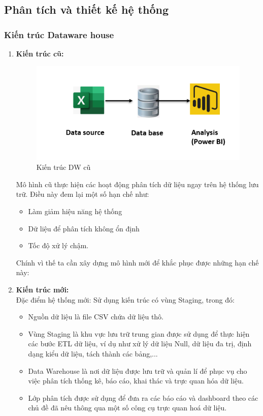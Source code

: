 \subsection{Phân tích và thiết kế hệ thống}

\subsubsection{Kiến trúc Dataware house}
\begin{enumerate}
    \item \textbf{Kiến trúc cũ:}
    \begin{center}
            \begin{figure}[!h]
                \centering
                \includegraphics[scale = 1]{figures/Duyen/Kiến trúc cũ.PNG}
              \caption{Kiến trúc DW cũ}
            \end{figure}
\end{center}
    Mô hình cũ thực hiện các hoạt động phân tích dữ liệu ngay trên hệ thống lưu trữ. Điều này đem lại một số hạn chế như:
    \begin{itemize}[label=$-$]
        \item Làm giảm hiệu năng hệ thống 
\item Dữ liệu để phân tích không ổn định
\item Tốc độ xử lý chậm.
    \end{itemize}
Chính vì thế ta cần xây dựng mô hình mới để khắc phục được những hạn chế này:
    \item \textbf{ Kiến trúc mới:}\\
Đặc điểm hệ thống mới:
Sử dụng kiến trúc có vùng Staging, trong đó:
\begin{itemize}
    \item Nguồn dữ liệu là file CSV chứa dữ liệu thô.
    \item Vùng Staging là khu vực lưu trữ trung gian được sử dụng để thực hiện các bước ETL dữ liệu, ví dụ như xử lý dữ liệu Null, dữ liệu đa trị, định dạng kiểu dữ liệu, tách thành các bảng,...
    \item Data Warehouse là nơi dữ liệu được lưu trữ và quản lí để phục vụ cho việc phân tích thống kê, báo cáo, khai thác và trực quan hóa dữ liệu.
    \item Lớp phân tích được sử dụng để đưa ra các báo cáo và dashboard theo các chủ đề đã nêu thông qua một số công cụ trực quan hoá dữ liệu.
    

\end{itemize}
\end{enumerate}
